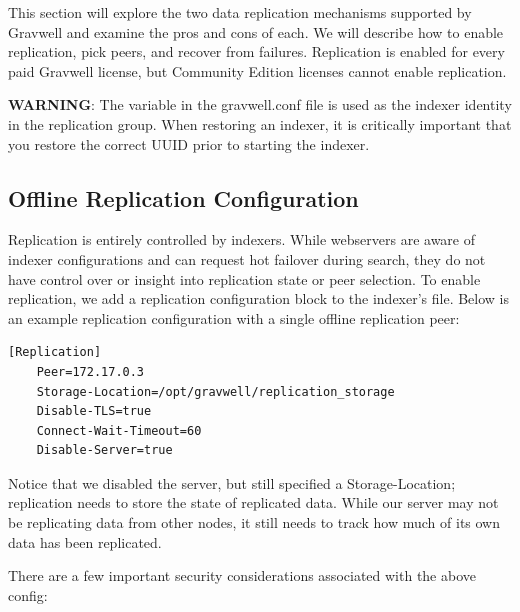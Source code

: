 {This section will explore the two data replication mechanisms supported
by Gravwell and examine the pros and cons of each. We will describe how
to enable replication, pick peers, and recover from failures.
Replication is enabled for every paid Gravwell license, but Community
Edition licenses cannot enable replication.

\textbf{WARNING}: The  variable in the gravwell.conf file is
used as the indexer identity in the replication group. When restoring
an indexer, it is critically important that you restore the correct UUID
prior to starting the indexer.

\subsection{Offline Replication Configuration}

Replication is entirely controlled by indexers. While webservers are
aware of indexer configurations and can request hot failover during
search, they do not have control over or insight into replication state
or peer selection. To enable replication, we add a replication
configuration block to the indexer's  file. Below is
an example replication configuration with a single offline replication
peer:

\begin{Verbatim}[breaklines=true]
[Replication]
    Peer=172.17.0.3
    Storage-Location=/opt/gravwell/replication_storage
    Disable-TLS=true
    Connect-Wait-Timeout=60
    Disable-Server=true
\end{Verbatim}

Notice that we disabled the server, but still specified a
Storage-Location; replication needs to store the state of replicated
data. While our server may not be replicating data from other nodes, it
still needs to track how much of its own data has been replicated.

There are a few important security considerations associated with the
above config:

}
